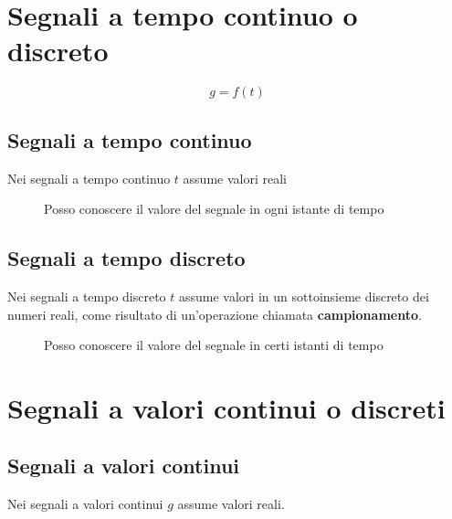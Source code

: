 \documentclass[12pt, a4paper]{report}
\begin{document}
\section{Segnali a tempo continuo o discreto}
\begin{equation*}
    g = f(t)
\end{equation*}
\subsection{Segnali a tempo continuo}
Nei segnali a tempo continuo $t$ assume valori reali
\begin{figure}[h!]
    \centering
    \caption{Posso conoscere il valore del segnale in ogni istante di tempo}
\end{figure}
\subsection{Segnali a tempo discreto}
Nei segnali a tempo discreto $t$ assume valori in un sottoinsieme discreto dei numeri reali, come risultato di un'operazione chiamata \textbf{campionamento}.
\begin{figure}[h!]
    \centering
    \caption{Posso conoscere il valore del segnale in certi istanti di tempo}
\end{figure}
\section{Segnali a valori continui o discreti}
\subsection{Segnali a valori continui}
Nei segnali a valori continui $g$ assume valori reali.
\end{document}
